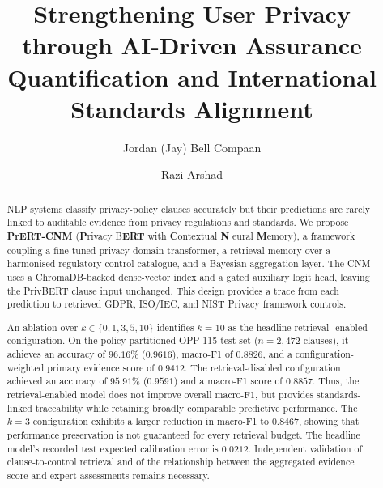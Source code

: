 \documentclass[final,3p,times,twocolumn]{elsarticle}
\begin{document}
	\begin{frontmatter}
		\title{Strengthening User Privacy through AI-Driven Assurance Quantification
		and International Standards Alignment}

		\author[ku]{Jordan (Jay) Bell Compaan}

		\author[ku]{Razi Arshad}


		\begin{abstract}
NLP systems classify privacy-policy clauses accurately but their predictions are rarely 
linked to auditable evidence from privacy regulations and standards. We propose 
\textbf{PrERT-CNM} (\textbf{P}rivacy B\textbf{ERT} with \textbf{C}ontextual \textbf{N}
eural \textbf{M}emory), a framework coupling a fine-tuned privacy-domain transformer, a 
retrieval memory over a harmonised regulatory-control catalogue, and a Bayesian 
aggregation layer. The CNM uses a ChromaDB-backed dense-vector index and a gated auxiliary 
logit head, leaving the PrivBERT clause input unchanged. This design provides a trace 
from each prediction to retrieved GDPR, ISO/IEC, and NIST Privacy framework controls.
            
An ablation over $k \in \{0, 1, 3, 5, 10\}$ identifies $k=10$ as the headline retrieval-
enabled configuration. On the policy-partitioned OPP-115 test set ($n=2{,}472$ clauses), 
it achieves an accuracy of $96.16\%$ ($0.9616$), macro-F1 of $0.8826$, and a 
configuration-weighted primary evidence score of $0.9412$. The retrieval-disabled 
configuration achieved an accuracy of $95.91\%$ ($0.9591$) and a macro-F1 score of 
$0.8857$. Thus, the retrieval-enabled model does not improve overall macro-F1, but 
provides standards-linked traceability while retaining broadly comparable predictive 
performance. The $k=3$ configuration exhibits a larger reduction in macro-F1 to $0.8467$, 
showing that performance preservation is not guaranteed for every retrieval budget. The 
headline model's recorded test expected calibration error is $0.0212$. Independent 
validation of clause-to-control retrieval and of the relationship between the aggregated 
evidence score and expert assessments remains necessary.



\end{abstract}
\end{frontmatter}
\end{document}
